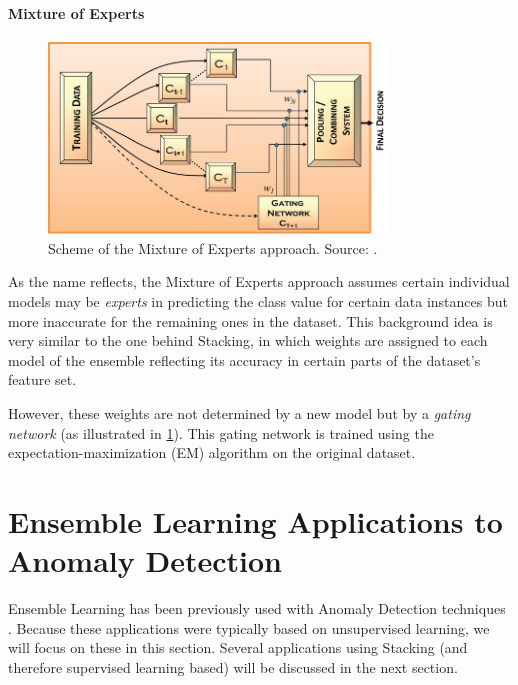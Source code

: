 \paragraph{Mixture of Experts}\mbox{}

\begin{figure}[ht!]
	\centering
	\includegraphics[width=0.8\textwidth]{figures/mixture_models}
	\caption{Scheme of the Mixture of Experts approach. Source: \cite{Polikar2012a}.}
	\label{fig:mixture}
\end{figure}

As the name reflects, the Mixture of Experts approach assumes certain individual models may be \textit{experts} in predicting the class value for certain data instances but more inaccurate for the remaining ones in the dataset. This background idea is very similar to the one behind Stacking, in which weights are assigned to each model of the ensemble reflecting its accuracy in certain parts of the dataset's feature set.

However, these weights are not determined by a new model but by a \textit{gating network} (as illustrated in \ref{fig:mixture}).
This gating network is trained using the expectation-maximization (EM) algorithm on the original dataset.

\section{Ensemble Learning Applications to Anomaly Detection}

Ensemble Learning has been previously used with Anomaly Detection techniques \cite{Aggarwal:2013:OA:2436823}.
Because these applications were typically based on unsupervised learning, we will focus on these in this section.
Several applications using Stacking (and therefore supervised learning based) will be discussed in the next section.


